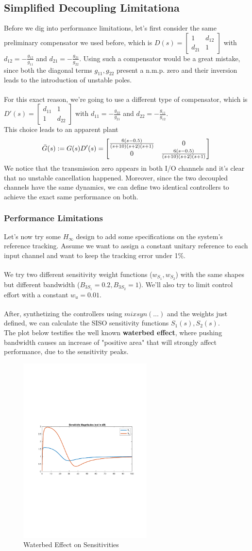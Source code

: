 \documentclass[a4paper, 12pt]{article}
\def\FigureFourteen{\centering\includegraphics[width=0.6\textwidth]{Figures/fig14.pdf}}
\begin{document}
\subsection{Simplified Decoupling Limitationa}
Before we dig into performance limitations, let's first consider the same preliminary compensator we used before, which is $D(s) = \begin{bmatrix}
1 & d_{12}\\
d_{21} & 1
\end{bmatrix}$
with $d_{12} = -\frac{g_{12}}{g_{11}}$ and $d_{21} = -\frac{g_{21}}{g_{22}}$. Using such a compensator would be a great mistake, since both the diagonal terms $g_{11}, g_{22}$ present a n.m.p. zero and their inversion leads to the introduction of unstable poles.
\\\\
For this exact reason, we're going to use a different type of compensator, which is $D'(s) = \begin{bmatrix}
d_{11} & 1\\
1 & d_{22}
\end{bmatrix}$
with $d_{11} = -\frac{g_{22}}{g_{21}}$ and $d_{22} = -\frac{g_{11}}{g_{12}}$.\\
This choice leads to an apparent plant 
\begin{equation}
\Bar{G}(s) := G(s)D'(s) = \begin{bmatrix}
\frac{6(s-0.5)}{(s+10) (s+2) (s+1)} & 0\\
0 & \frac{6(s-0.5)}{(s+10) (s+2) (s+1)}
\end{bmatrix}
\end{equation}
We notice that the transmission zero appears in both I/O channels and it's clear that no unstable cancellation happened. Moreover, since the two decoupled channels have the same dynamics, we can define two identical controllers to achieve the exact same performance on both.
\subsubsection{Performance Limitations}
Let's now try some $H_\infty$ design to add some specifications on the system's reference tracking. Assume we want to assign a constant unitary reference to each input channel and want to keep the tracking error under 1\%.
\\\\
We try two different sensitivity weight functions ($w_S_1, w_S_2$) with the same shapes but different bandwidth ($B_{3S_1} = 0.2, B_{3S_2} = 1$). We'll also try to limit control effort with a constant $w_u = 0.01$. 
\\\\
After, synthetizing the controllers using $mixsyn(\dots)$ and the weights just defined, we can calculate the SISO sensitivity functions $S_1(s), S_2(s)$.
\\The plot below testifies the well known \textbf{waterbed effect}, where pushing bandwidth causes an increase of "positive area" that will strongly affect performance, due to the sensitivity peaks.
\begin{figure}[h!]
    \FigureFourteen
    \caption{Waterbed Effect on Sensitivities}
    \label{fig:fig14}
\end{figure}
\end{document}
